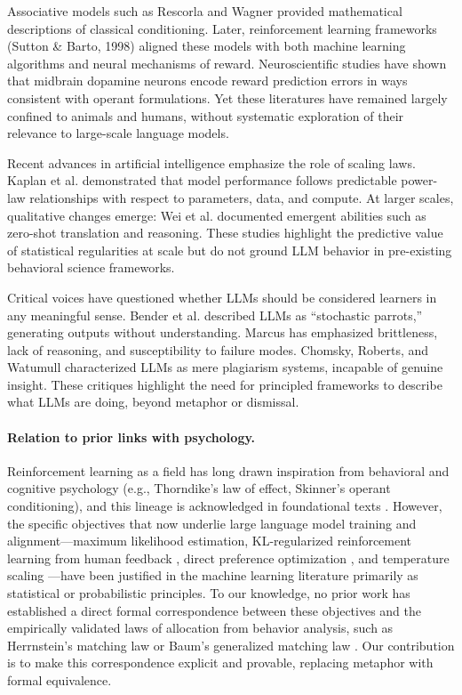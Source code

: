 \documentclass[11pt]{article}
\begin{document}
Associative models such as Rescorla and Wagner \citep{rescorla1972theory} provided mathematical descriptions of classical conditioning. Later, reinforcement learning frameworks (Sutton \& Barto, 1998) aligned these models with both machine learning algorithms and neural mechanisms of reward. Neuroscientific studies have shown that midbrain dopamine neurons encode reward prediction errors in ways consistent with operant formulations. Yet these literatures have remained largely confined to animals and humans, without systematic exploration of their relevance to large-scale language models.

Recent advances in artificial intelligence emphasize the role of scaling laws. Kaplan et al. \citep{kaplan2020scaling} demonstrated that model performance follows predictable power-law relationships with respect to parameters, data, and compute. At larger scales, qualitative changes emerge: Wei et al. \citep{wei2022emergent} documented emergent abilities such as zero-shot translation and reasoning. These studies highlight the predictive value of statistical regularities at scale but do not ground LLM behavior in pre-existing behavioral science frameworks.

Critical voices have questioned whether LLMs should be considered learners in any meaningful sense. Bender et al. \citep{bender2021dangers} described LLMs as “stochastic parrots,” generating outputs without understanding. Marcus \citep{marcus2022critique} has emphasized brittleness, lack of reasoning, and susceptibility to failure modes. Chomsky, Roberts, and Watumull \citep{chomsky2023nytimes} characterized LLMs as mere plagiarism systems, incapable of genuine insight. These critiques highlight the need for principled frameworks to describe what LLMs are doing, beyond metaphor or dismissal.

\paragraph{Relation to prior links with psychology.}
Reinforcement learning as a field has long drawn inspiration from behavioral and
cognitive psychology (e.g., Thorndike’s law of effect, Skinner’s operant
conditioning), and this lineage is acknowledged in foundational texts
\citep{sutton1998reinforcement}. However, the specific objectives that now
underlie large language model training and alignment---maximum likelihood
estimation, KL-regularized reinforcement learning from human feedback
\citep{christiano2017deep,ouyang2022training}, direct preference optimization
\citep{rafailov2023direct}, and temperature scaling \citep{guo2017calibration}---have
been justified in the machine learning literature primarily as statistical or
probabilistic principles. To our knowledge, no prior work has established a
direct formal correspondence between these objectives and the empirically
validated laws of allocation from behavior analysis, such as Herrnstein’s
matching law \citep{herrnstein1961matching} or Baum’s generalized matching law
\citep{baum1974generalized}. Our contribution is to make this correspondence
explicit and provable, replacing metaphor with formal equivalence.
\end{document}
